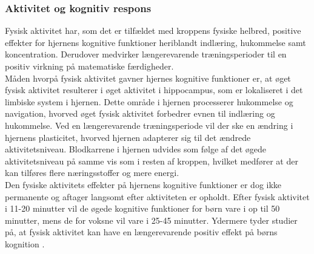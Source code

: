 \subsubsection{Aktivitet og kognitiv respons}
Fysisk aktivitet har, som det er tilfældet med kroppens fysiske helbred, positive effekter for hjernens kognitive funktioner heriblandt indlæring, hukommelse samt koncentration. %
Derudover medvirker længerevarende træningsperioder til en positiv virkning på matematiske færdigheder\citep{Bugge2015,Berchtold2010,Schmidt2015}.\\
Måden hvorpå fysisk aktivitet gavner hjernes kognitive funktioner er, at øget fysisk aktivitet resulterer i øget aktivitet i hippocampus, som er lokaliseret i det limbiske system i hjernen. Dette område i hjernen processerer hukommelse og navigation, hvorved øget fysisk aktivitet forbedrer evnen til indlæring og hukommelse. Ved en længerevarende træningsperiode vil der ske en ændring i hjernens plasticitet, hvorved hjernen adapterer sig til det ændrede aktivitetsniveau. Blodkarrene i hjernen udvides som følge af det øgede aktivitetsniveau på samme vis som i resten af kroppen, hvilket medfører at der kan tilføres flere næringsstoffer og mere energi. \citep{Cotman2007}\\
Den fysiske aktivitets effekter på hjernens kognitive funktioner er dog ikke permanente og aftager langsomt efter aktiviteten er opholdt. Efter fysisk aktivitet i 11-20 minutter vil de øgede kognitive funktioner for børn vare i op til 50 minutter, mens de for voksne vil vare i 25-45 minutter. \citep{Cotman2007} Ydermere tyder studier på, at fysisk aktivitet kan have en længerevarende positiv effekt på børns kognition \citep{SibleyEtnier2003}.



